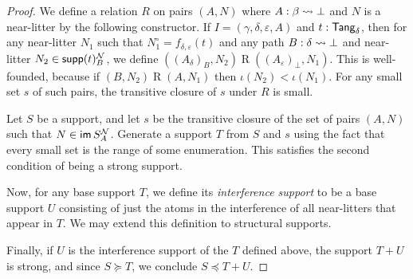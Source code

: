 \begin{proof}
  We define a relation \( R \) on pairs \( (A, N) \) where \( A : \beta \rightsquigarrow \bot \) and \( N \) is a near-litter by the following constructor.
  If \( I = (\gamma,\delta,\varepsilon,A) \) and \( t : \mathsf{Tang}_\delta \), then for any near-litter \( N_1 \) such that \( N_1^\circ = f_{\delta,\varepsilon}(t) \) and any path \( B : \delta \rightsquigarrow \bot \) and near-litter \( N_2 \in \operatorname{\mathsf{supp}}(t)_B^{\mathcal N} \), we define \( ((A_\delta)_B, N_2) \mathrel{R} ((A_\varepsilon)_\bot, N_1) \).
  This is well-founded, because if \( (B, N_2) \mathrel{R} (A, N_1) \) then \( \iota(N_2) < \iota(N_1) \).
  For any small set \( s \) of such pairs, the transitive closure of \( s \) under \( R \) is small.

  Let \( S \) be a support, and let \( s \) be the transitive closure of the set of pairs \( (A, N) \) such that \( N \in \operatorname{\mathsf{im}} S_A^{\mathcal N} \).
  Generate a support \( T \) from \( S \) and \( s \) using the fact that every small set is the range of some enumeration.
  This satisfies the second condition of being a strong support.

  Now, for any base support \( T \), we define its \emph{interference support} to be a base support \( U \) consisting of just the atoms in the interference of all near-litters that appear in \( T \).
  We may extend this definition to structural supports.

  Finally, if \( U \) is the interference support of the \( T \) defined above, the support \( T + U \) is strong, and since \( S \succeq T \), we conclude \( S \preceq T + U \).
\end{proof}

